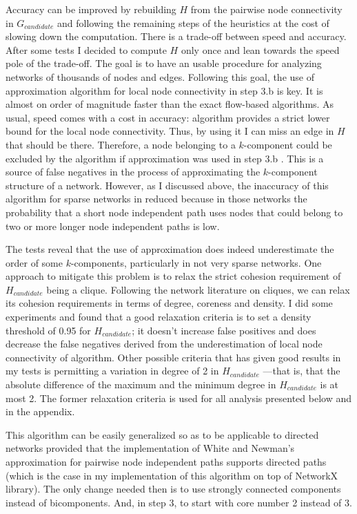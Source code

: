 Accuracy can be improved by rebuilding $H$ from the pairwise node connectivity in $G_{candidate}$ and following the remaining steps of the heuristics at the cost of slowing down the computation. There is a trade-off between speed and accuracy. After some tests I decided to compute $H$ only once and lean towards the speed pole of the trade-off. The goal is to have an usable procedure for analyzing networks of thousands of nodes and edges. Following this goal, the use of \citet{white:2001b} approximation algorithm for local node connectivity in step 3.b is key. It is almost on order of magnitude faster than the exact flow-based algorithms. As usual, speed comes with a cost in accuracy: \citet{white:2001b} algorithm provides a strict lower bound for the local node connectivity. Thus, by using it I can miss an edge in $H$ that should be there. Therefore, a node belonging to a $k$-component could be excluded by the algorithm if \citet{white:2001b} approximation was used in step 3.b . This is a source of false negatives in the process of approximating the $k$-component structure of a network. However, as I discussed above, the inaccuracy of this algorithm for sparse networks in reduced because in those networks the probability that a short node independent path uses nodes that could belong to two or more longer node independent paths is low.

The tests reveal that the use of \citet{white:2001b} approximation does indeed underestimate the order of some $k$-components, particularly in not very sparse networks. One approach to mitigate this problem is to relax the strict cohesion requirement of $H_{candidate}$ being a clique. Following the network literature on cliques, we can relax its cohesion requirements in terms of degree, coreness and density. I did some experiments and found that a good relaxation criteria is to set a density threshold of 0.95 for $H_{candidate}$; it doesn't increase false positives and does decrease the false negatives derived from the underestimation of local node connectivity of \citet{white:2001b} algorithm.  Other possible criteria that has given good results in my tests is permitting a variation in degree of 2 in $H_{candidate}$ ---that is, that the absolute difference of the maximum and the minimum degree in $H_{candidate}$ is at most 2. The former relaxation criteria is used for all analysis presented below and in the appendix.

This algorithm can be easily generalized so as to be applicable to directed networks provided that the implementation of White and Newman's approximation for pairwise node independent paths supports directed paths (which is the case in my implementation of this algorithm on top of NetworkX library). The only change needed then is to use strongly connected components instead of bicomponents. And, in step 3, to start with core number 2 instead of 3.

